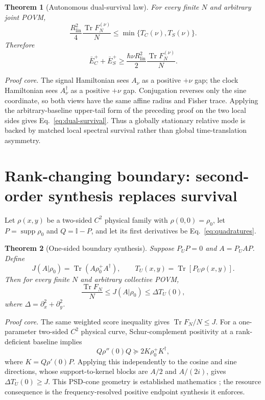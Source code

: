 \documentclass[aps,pra,preprint,nofootinbib]{revtex4-2}
\newtheorem{theorem}{Theorem}
\newcommand{\Tr}{\operatorname{Tr}}
\newcommand{\supp}{\operatorname{supp}}
\newcommand{\id}{\mathbb I}
\newcommand{\Rlin}{R_{\mathrm{lin}}}
\newcommand{\rhozero}{\rho_0}
\newcommand{\Fcl}{F}
\begin{document}
\begin{theorem}[Autonomous dual-survival law]
\label{thm:dual-survival}
For every finite $N$ and arbitrary joint POVM,
\begin{equation}
\boxed{
\frac{\Rlin^2}{4}\frac{\Tr \Fcl_N^{(\nu)}}{N}
\le \min\{T_C(\nu),T_S(\nu)\}.
}
\label{eq:dual-survival}
\end{equation}
Therefore
\begin{equation}
\bar E_C^+ +\bar E_S^+
\ge
\frac{\hbar\nu\Rlin^2}{2}
\frac{\Tr \Fcl_N^{(\nu)}}{N}.
\label{eq:dual-energy}
\end{equation}
\end{theorem}

\emph{Proof core.} The signal Hamiltonian sees $A_\nu$ as a positive $+\nu$ gap; the clock Hamiltonian sees $A_\nu^\dagger$ as a positive $+\nu$ gap. Conjugation reverses only the sine coordinate, so both views have the same affine radius and Fisher trace. Applying the arbitrary-baseline upper-tail form of the preceding proof on the two local sides gives Eq.~\eqref{eq:dual-survival}. Thus a globally stationary relative mode is backed by matched local spectral survival rather than global time-translation asymmetry.

\section{Rank-changing boundary: second-order synthesis replaces survival}
\label{sec:boundary}

Let $\rho(x,y)$ be a two-sided $C^2$ physical family with $\rho(0,0)=\rhozero$, let $P=\supp\rhozero$ and $Q=\id-P$, and let its first derivatives be Eq.~\eqref{eq:quadratures}.

\begin{theorem}[One-sided boundary synthesis]
\label{thm:one-sided-boundary}
Suppose $P_U P=0$ and $A=P_UAP$. Define
\begin{equation}
J(A|\rhozero)=\Tr(A\rhozero^+A^\dagger),
\qquad
T_U(x,y)=\Tr[P_U\rho(x,y)].
\end{equation}
Then for every finite $N$ and arbitrary collective POVM,
\begin{equation}
\boxed{
\frac{\Tr \Fcl_N}{N}
\le J(A|\rhozero)
\le \Delta T_U(0),
}
\label{eq:one-sided-boundary}
\end{equation}
where $\Delta=\partial_x^2+\partial_y^2$.
\end{theorem}

\emph{Proof core.} The same weighted score inequality gives $\Tr F_N/N\le J$. For a one-parameter two-sided $C^2$ physical curve, Schur-complement positivity at a rank-deficient baseline implies
\begin{equation}
Q\rho''(0)Q\succeq2K\rhozero^+K^\dagger,
\end{equation}
where $K=Q\rho'(0)P$. Applying this independently to the cosine and sine directions, whose support-to-kernel blocks are $A/2$ and $A/(2i)$, gives $\Delta T_U(0)\ge J$. This PSD-cone geometry is established mathematics \cite{Shapiro1997,BonnansCominettiShapiro1999}; the resource consequence is the frequency-resolved positive endpoint synthesis it enforces.
\end{document}
